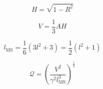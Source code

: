 \begin{equation} \label{eq:tet_height}
H = \sqrt{1-R^2}
\end{equation}

\begin{equation} \label{eq:tet_volume}
V = \frac13 A H
\end{equation}

\begin{equation} \label{eq:msl}
l_{\text{MS}} = \frac16(3l^2 + 3) = \frac12(l^2 + 1)
\end{equation}

\begin{equation} \label{angle_quality}
\mathcal{Q} = \left(\frac{V^2}{\gamma^2 l_{\text{MS}}^3}\right)^{\frac13}
\end{equation}

